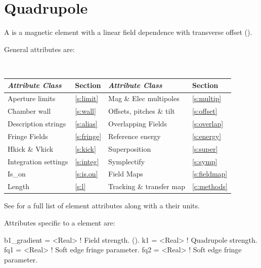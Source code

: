 {\section{Quadrupole}
\label{s:quad}

A  is a magnetic element with a linear field dependence
with transverse offset ().

General  attributes are:
\begin{center}
\tt
\begin{tabular}{llll} \toprule
  {\sl Attribute Class}      & Section           & {\sl Attribute Class}      & Section            \\ \midrule
  Aperture limits            & \ref{s:limit}     & Mag \& Elec multipoles     & \ref{s:multip}     \\
  Chamber wall               & \ref{s:wall}      & Offsets, pitches \& tilt   & \ref{s:offset}     \\
  Description strings        & \ref{s:alias}     & Overlapping Fields         & \ref{s:overlap}    \\
  Fringe Fields              & \ref{s:fringe}    & Reference energy           & \ref{s:energy}     \\ 
  Hkick \& Vkick             & \ref{s:kick}      & Superposition              & \ref{s:super}      \\
  Integration settings       & \ref{s:integ}     & Symplectify                & \ref{s:symp}       \\
  Is_on                      & \ref{s:is.on}     & Field Maps                 & \ref{s:fieldmap}   \\ 
  Length                     & \ref{s:l}         & Tracking \& transfer map   & \ref{c:methods}    \\ 
  \bottomrule
\end{tabular}
\end{center}
\toffset
See  for a full list of element attributes along with a their units.

Attributes specific to a  element are:
\begin{example}
  b1_gradient    = <Real>    ! Field strength. ().
  k1             = <Real>    ! Quadrupole strength.
  fq1            = <Real>    ! Soft edge fringe parameter.
  fq2            = <Real>    ! Soft edge fringe parameter.
 \end{example}

}
